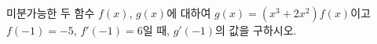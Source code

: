 미분가능한 두 함수 $f(x)$, $g(x)$에 대하여 $g(x)=(x^3+2x^2)f(x)$이고 $f(-1)=-5$, $f'(-1)=6$일 때, $g'(-1)$의 값을 구하시오.
